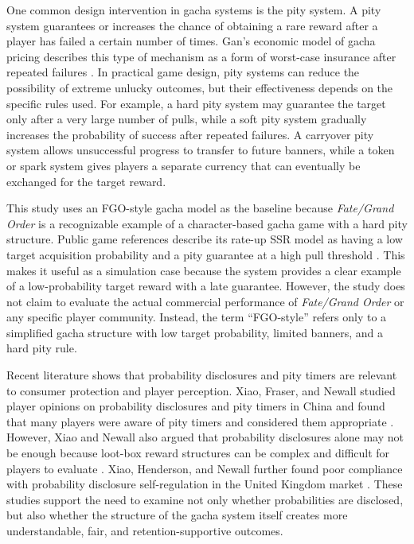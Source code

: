 \documentclass[sigconf,nonacm]{acmart}
\begin{document}
One common design intervention in gacha systems is the pity system. A pity system guarantees or increases the chance of obtaining a rare reward after a player has failed a certain number of times. Gan's economic model of gacha pricing describes this type of mechanism as a form of worst-case insurance after repeated failures \cite{gan2022gacha}. In practical game design, pity systems can reduce the possibility of extreme unlucky outcomes, but their effectiveness depends on the specific rules used. For example, a hard pity system may guarantee the target only after a very large number of pulls, while a soft pity system gradually increases the probability of success after repeated failures. A carryover pity system allows unsuccessful progress to transfer to future banners, while a token or spark system gives players a separate currency that can eventually be exchanged for the target reward.

This study uses an FGO-style gacha model as the baseline because \textit{Fate/Grand Order} is a recognizable example of a character-based gacha game with a hard pity structure. Public game references describe its rate-up SSR model as having a low target acquisition probability and a pity guarantee at a high pull threshold \cite{fgowiki2024pity}. This makes it useful as a simulation case because the system provides a clear example of a low-probability target reward with a late guarantee. However, the study does not claim to evaluate the actual commercial performance of \textit{Fate/Grand Order} or any specific player community. Instead, the term ``FGO-style'' refers only to a simplified gacha structure with low target probability, limited banners, and a hard pity rule.

Recent literature shows that probability disclosures and pity timers are relevant to consumer protection and player perception. Xiao, Fraser, and Newall studied player opinions on probability disclosures and pity timers in China and found that many players were aware of pity timers and considered them appropriate \cite{xiao2022pandora}. However, Xiao and Newall also argued that probability disclosures alone may not be enough because loot-box reward structures can be complex and difficult for players to evaluate \cite{xiao2022probability}. Xiao, Henderson, and Newall further found poor compliance with probability disclosure self-regulation in the United Kingdom market \cite{xiao2023odds}. These studies support the need to examine not only whether probabilities are disclosed, but also whether the structure of the gacha system itself creates more understandable, fair, and retention-supportive outcomes.
\end{document}
